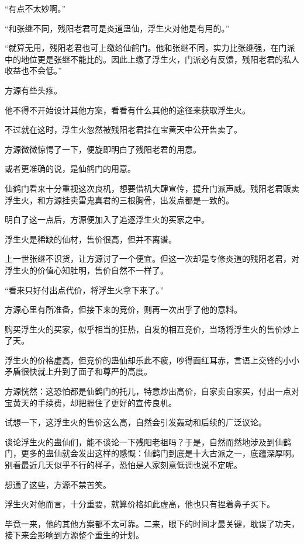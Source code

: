 \begin{this_body}
“有点不太妙啊。”

“和张继不同，残阳老君可是炎道蛊仙，浮生火对他是有用的。”

“就算无用，残阳老君也可上缴给仙鹤门。他和张继不同，实力比张继强，在门派中的地位更是张继不能比的。因此上缴了浮生火，门派必有反馈，残阳老君的私人收益也不会低。”

方源有些头疼。

他不得不开始设计其他方案，看看有什么其他的途径来获取浮生火。

不过就在这时，浮生火忽然被残阳老君挂在宝黄天中公开售卖了。

方源微微惊愕了一下，便旋即明白了残阳老君的用意。

或者更准确的说，是仙鹤门的用意。

仙鹤门看来十分重视这次良机，想要借机大肆宣传，提升门派声威。残阳老君贩卖浮生火，和方源挂卖雷鬼真君的三根胸骨，出发点都是一致的。

明白了这一点后，方源便加入了追逐浮生火的买家之中。

浮生火是稀缺的仙材，售价很高，但并不离谱。

上一世张继不识货，让方源讨了一个便宜。但这一次却是专修炎道的残阳老君，对浮生火的价值心知肚明，售价自然不一样了。

“看来只好付出点代价，将浮生火拿下来了。”

方源心里有所准备，但接下来的竞价，则再一次出乎了他的意料。

购买浮生火的买家，似乎相当的狂热，自发的相互竞价，当场将浮生火的售价炒上了天。

浮生火的价格虚高，但竞价的蛊仙却乐此不疲，吵得面红耳赤，言语上交锋的小小矛盾很快就上升到了面子和尊严的高度。

方源恍然：这恐怕都是仙鹤门的托儿，特意炒出高价，自家卖自家买，付出一点对宝黄天的手续费，却把握住了更好的宣传良机。

试想一下，这浮生火的售价这么高，自然会引发轰动和后续的广泛议论。

谈论浮生火的蛊仙们，能不谈论一下残阳老祖吗？于是，自然而然地涉及到仙鹤门，更多的蛊仙就会发出这样的感慨：仙鹤门到底是十大古派之一，底蕴深厚啊。别看最近几天似乎不行的样子，恐怕是人家刻意低调也说不定呢。

想通了这些，方源不禁苦笑。

浮生火对他而言，十分重要，就算价格如此虚高，他也只有捏着鼻子买下。

毕竟一来，他的其他方案都不太可靠。二来，眼下的时间才最关键，耽误了功夫，接下来会影响到方源整个重生的计划。


\end{this_body}
